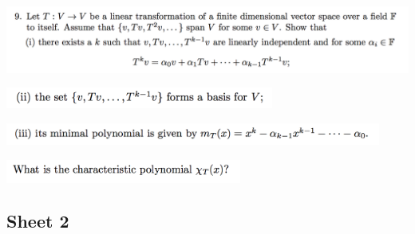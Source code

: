 \subsubsection{} %
\begin{mdframed}
  \includegraphics[width=400pt]{img/linear-algebra-a0-1-9-a.png}\\
\end{mdframed}
\begin{mdframed}
  \includegraphics[width=250pt]{img/linear-algebra-a0-1-9-b.png}\\
\end{mdframed}
\begin{mdframed}
  \includegraphics[width=350pt]{img/linear-algebra-a0-1-9-c.png}\\
\end{mdframed}
\begin{mdframed}
  \includegraphics[width=220pt]{img/linear-algebra-a0-1-9-d.png}\\
\end{mdframed}

\newpage
\subsection{Sheet 2}

